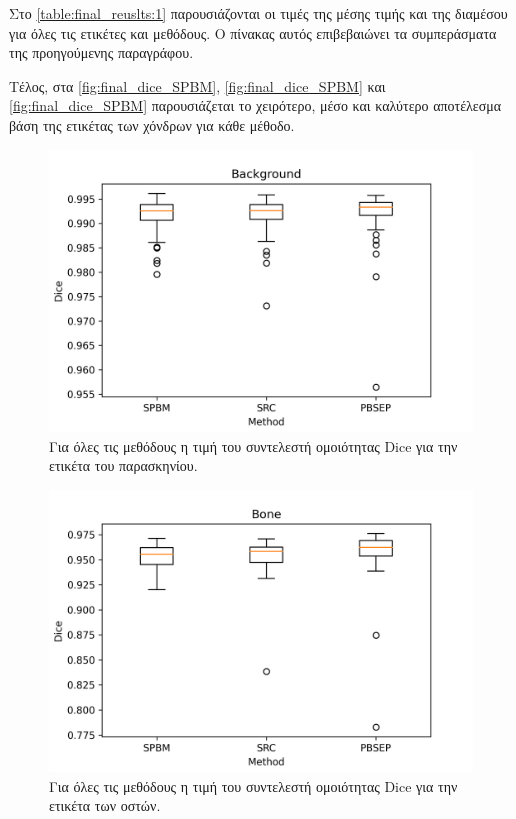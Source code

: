 \documentclass[a4paper,12pt]{article}
\begin{document}
Στο \autoref{table:final_reuslts:1} παρουσιάζονται οι τιμές της μέσης τιμής και
της διαμέσου για όλες τις ετικέτες και μεθόδους. Ο πίνακας αυτός επιβεβαιώνει τα
συμπεράσματα της προηγούμενης παραγράφου.

Τέλος, στα \autoref{fig:final_dice_SPBM}, \autoref{fig:final_dice_SPBM}
και \autoref{fig:final_dice_SPBM} παρουσιάζεται το χειρότερο, μέσο και καλύτερο
αποτέλεσμα βάση της ετικέτας των χόνδρων για κάθε μέθοδο.


\begin{figure}[H]
    \centering
    \includegraphics[width=0.85\linewidth]{Dice_final_Background_plot.png}
    \caption{Για όλες τις μεθόδους η τιμή του συντελεστή ομοιότητας Dice για την
             ετικέτα του παρασκηνίου.}
    \label{fig:dice_final:1}
\end{figure}

\begin{figure}[H]
    \centering
    \includegraphics[width=0.85\linewidth]{Dice_final_Bone_plot.png}
    \caption{Για όλες τις μεθόδους η τιμή του συντελεστή ομοιότητας Dice για την
             ετικέτα των οστών.}
    \label{fig:dice_final:2}
\end{figure}
\end{document}
